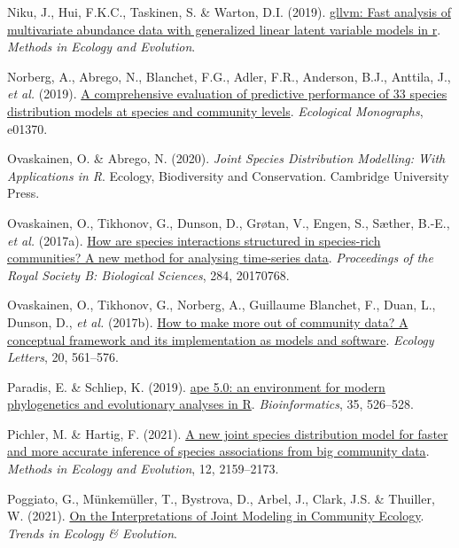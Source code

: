 \documentclass[9pt,biorxiv,doublespacing,lineno]{lapreprint}
\newlength{\cslhangindent}
\newlength{\cslentryspacingunit} %
\newenvironment{CSLReferences}[2] %
 {%
  \setlength{\parindent}{0pt}
  \ifodd #1
  \let\oldpar\par
  \def\par{\hangindent=\cslhangindent\oldpar}
  \fi
  \setlength{\parskip}{#2\cslentryspacingunit}
 }%
 {}
\begin{document}
\begin{CSLReferences}{1}{0}
\leavevmode{}%
Niku, J., Hui, F.K.C., Taskinen, S. \& Warton, D.I. (2019).
\href{https://doi.org/10.1111/2041-210X.13303}{gllvm: Fast analysis of
multivariate abundance data with generalized linear latent variable
models in r}. \emph{Methods in Ecology and Evolution}.

\leavevmode{}%
Norberg, A., Abrego, N., Blanchet, F.G., Adler, F.R., Anderson, B.J.,
Anttila, J., \emph{et al.} (2019).
\href{https://doi.org/10.1002/ecm.1370}{A comprehensive evaluation of
predictive performance of 33 species distribution models at species and
community levels}. \emph{Ecological Monographs}, e01370.

\leavevmode{}%
Ovaskainen, O. \& Abrego, N. (2020). \emph{Joint Species Distribution
Modelling: With Applications in R}. Ecology, Biodiversity and
Conservation. Cambridge University Press.

\leavevmode{}%
Ovaskainen, O., Tikhonov, G., Dunson, D., Grøtan, V., Engen, S., Sæther,
B.-E., \emph{et al.} (2017a).
\href{https://doi.org/10.1098/rspb.2017.0768}{How are species
interactions structured in species-rich communities? A new method for
analysing time-series data}. \emph{Proceedings of the Royal Society B:
Biological Sciences}, 284, 20170768.

\leavevmode{}%
Ovaskainen, O., Tikhonov, G., Norberg, A., Guillaume Blanchet, F., Duan,
L., Dunson, D., \emph{et al.} (2017b).
\href{https://doi.org/10.1111/ele.12757}{How to make more out of
community data? A conceptual framework and its implementation as models
and software}. \emph{Ecology Letters}, 20, 561--576.

\leavevmode{}%
Paradis, E. \& Schliep, K. (2019).
\href{https://doi.org/10.1093/bioinformatics/bty633}{ape 5.0: an
environment for modern phylogenetics and evolutionary analyses in R}.
\emph{Bioinformatics}, 35, 526--528.

\leavevmode{}%
Pichler, M. \& Hartig, F. (2021).
\href{https://doi.org/10.1111/2041-210X.13687}{A new joint species
distribution model for faster and more accurate inference of species
associations from big community data}. \emph{Methods in Ecology and
Evolution}, 12, 2159--2173.

\leavevmode{}%
Poggiato, G., Münkemüller, T., Bystrova, D., Arbel, J., Clark, J.S. \&
Thuiller, W. (2021).
\href{https://doi.org/10.1016/j.tree.2021.01.002}{On the Interpretations
of Joint Modeling in Community Ecology}. \emph{Trends in Ecology \&
Evolution}.


\end{CSLReferences}
\end{document}
